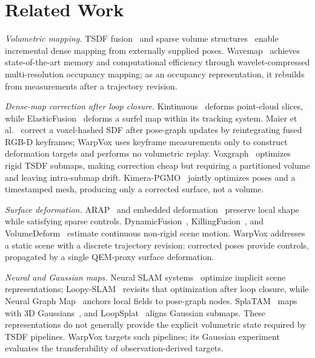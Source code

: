 \section{Related Work}
\label{sec:related}

\vspace{1mm}\noindent\textit{Volumetric mapping.}
TSDF fusion~\cite{10.1145/237170.237269,newcombe2011kinectfusion} and sparse volume structures~\cite{10.1145/2508363.2508374,Oleynikova_2017,vizzo2022vdbfusion} enable incremental dense mapping from externally supplied poses. Wavemap~\cite{reijgwart2023wavemap} achieves state-of-the-art memory and computational efficiency through wavelet-compressed multi-resolution occupancy mapping; as an occupancy representation, it rebuilds from measurements after a trajectory revision.

\vspace{1mm}\noindent\textit{Dense-map correction after loop closure.} Kintinuous~\cite{whelan2015kintinuous} deforms point-cloud slices, while ElasticFusion~\cite{whelan2016elasticfusion} deforms a surfel map within its tracking system. Maier et al.~\cite{BMVC2017_158} correct a voxel-hashed SDF after pose-graph updates by reintegrating fused RGB-D keyframes; WarpVox uses keyframe measurements only to construct deformation targets and performs no volumetric replay. Voxgraph~\cite{reijgwart2020voxgraph} optimizes rigid TSDF submaps, making correction cheap but requiring a partitioned volume and leaving intra-submap drift. Kimera-PGMO~\cite{kimera_pgmo} jointly optimizes poses and a timestamped
mesh, producing only a corrected surface, not a volume.

\vspace{1mm}\noindent\textit{Surface deformation.}
ARAP~\cite{ARAP_modeling:2007} and embedded deformation~\cite{10.1145/1276377.1276478} preserve local shape while satisfying sparse controls. DynamicFusion~\cite{7298631}, KillingFusion~\cite{slavcheva2017killingfusion}, and VolumeDeform~\cite{innmann2016volumedeform} estimate continuous non-rigid scene motion. WarpVox addresses a static scene with a discrete trajectory revision:
corrected poses provide controls, propagated by a single QEM-proxy
surface deformation.

\vspace{1mm}\noindent\textit{Neural and Gaussian maps.}
Neural SLAM systems~\cite{sucar2021imap,zhu2022niceslam,cui2023ngelslam} optimize implicit scene representations; Loopy-SLAM~\cite{liso2024loopyslam} revisits that optimization after loop closure, while Neural Graph Map~\cite{bruns2024neuralgraphmap} anchors local fields to pose-graph nodes. SplaTAM~\cite{keetha2024splatam} maps with 3D Gaussians~\cite{kerbl2023gaussians}, and LoopSplat~\cite{zhu2025_loopsplat} aligns Gaussian submaps. These representations do not generally provide the explicit volumetric state
required by TSDF pipelines. WarpVox targets such pipelines; its
Gaussian experiment evaluates the transferability of observation-derived
targets.
